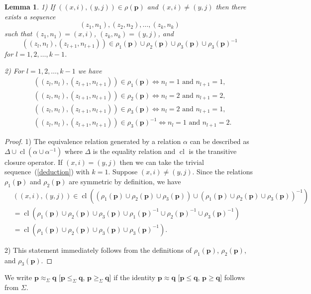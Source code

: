 \documentclass[12pt,draft]{amsart}
\newtheorem{lemma}{Lemma}
\DeclareMathOperator{\cl}{cl}
\begin{document}
\begin{lemma}
\label{easy}
\textup{1)} If $((x,i),(y,j))\in\rho(\mathbf p)$ and $(x,i)\neq(y,j)$ then there exists a sequence
\begin{equation}
\label{deduction}(z_1,n_1),(z_2,n_2),\dots,(z_k,n_k)
\end{equation}
such that $(z_1,n_1)=(x,i)$, $(z_k,n_k)=(y,j)$, and
$$((z_l,n_l),(z_{l+1},n_{l+1}))\in\rho_1(\mathbf p)\cup\rho_2(\mathbf p)\cup\rho_3(\mathbf p)\cup\rho_3(\mathbf p)^{-1}$$
for $l=1,2,\dots,k-1$.

\textup{2)} For $l=1,2,\dots,k-1$ we have
\begin{align*}
&((z_l,n_l),(z_{l+1},n_{l+1}))\in\rho_1(\mathbf p)\iff n_l=1\text{ and }n_{l+1}=1,\\
&((z_l,n_l),(z_{l+1},n_{l+1}))\in\rho_2(\mathbf p)\iff n_l=2\text{ and }n_{l+1}=2,\\
&((z_l,n_l),(z_{l+1},n_{l+1}))\in\rho_3(\mathbf p)\iff n_l=2\text{ and }n_{l+1}=1,\\
&((z_l,n_l),(z_{l+1},n_{l+1}))\in\rho_3(\mathbf p)^{-1}\iff n_l=1\text{ and }n_{l+1}=2.
\end{align*}
\end{lemma}
\begin{proof}
1) The equivalence relation generated by a relation $\alpha$ can be described as $\Delta\cup\cl(\alpha\cup\alpha^{-1})$ where $\Delta$ is the equality relation and $\cl$ is the transitive closure operator. If $(x,i)=(y,j)$ then we can take the trivial sequence~(\ref{deduction}) with $k=1$. Suppose $(x,i)\neq(y,j)$. Since the relations $\rho_1(\mathbf p)$ and $\rho_2(\mathbf p)$ are symmetric by definition, we have
\begin{align*}
&((x,i),(y,j))\in\cl((\rho_1(\mathbf p)\cup\rho_2(\mathbf p)\cup\rho_3(\mathbf p))\cup(\rho_1(\mathbf p)\cup\rho_2(\mathbf p)\cup\rho_3(\mathbf p))^{-1})\\
&=\cl(\rho_1(\mathbf p)\cup\rho_2(\mathbf p)\cup\rho_3(\mathbf p)\cup\rho_1(\mathbf p)^{-1}\cup\rho_2(\mathbf p)^{-1}\cup\rho_3(\mathbf p)^{-1})\\
&=\cl(\rho_1(\mathbf p)\cup\rho_2(\mathbf p)\cup\rho_3(\mathbf p)\cup\rho_3(\mathbf p)^{-1}).
\end{align*}

2) This statement immediately follows from the definitions of $\rho_1(\mathbf p)$, $\rho_2(\mathbf p)$, and $\rho_3(\mathbf p)$.
\end{proof}

We write $\mathbf p\approx_{\Sigma}\mathbf q$ [$\mathbf p\le_{\Sigma}\mathbf q$, $\mathbf p\ge_{\Sigma}\mathbf q$] if the identity $\mathbf p\approx\mathbf q$ [$\mathbf p\le\mathbf q$, $\mathbf p\ge\mathbf q$] follows from $\Sigma$.
\end{document}
